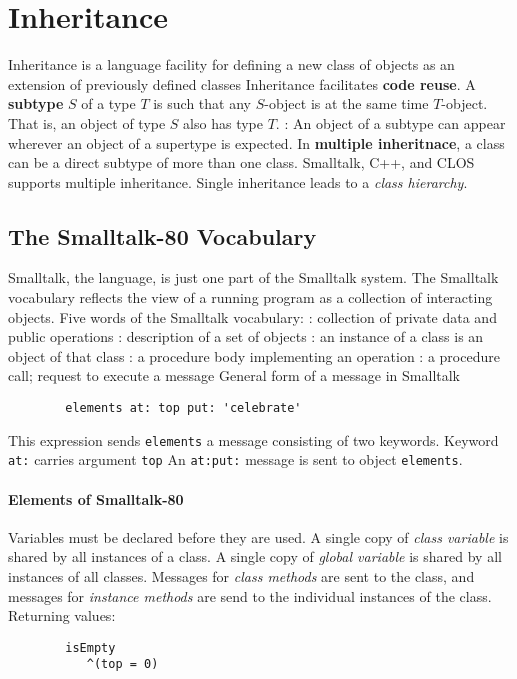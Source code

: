 \documentclass{article}
\begin{document}
\section{Inheritance}
\bit
\w Inheritance is a language facility for defining a new class of
	objects as an extension of previously defined classes
	\bit
	\w Inheritance facilitates {\bf{}code reuse}.
	\eit
\w A {\bf{}subtype} $S$ of a type $T$ is such that any $S$-object
	is at the same time $T$-object.
	\bit
	\w That is, an object of type $S$ also has type $T$.
	\eit
{}:
	\bit
	\w An object of a subtype can appear wherever an object of
		a supertype is expected.
	\eit
\w In {\bf{}multiple inheritnace}, a class can be a direct subtype of 
	more than one class.
	\bit
	\w Smalltalk, C++, and CLOS supports multiple inheritance.
	\eit
\w Single inheritance leads to a {\em{}class hierarchy\/}.
\eit

\subsection{The Smalltalk-80 Vocabulary}
\bit
\w Smalltalk, the language, is just one part of the Smalltalk 
	system.
\w The Smalltalk vocabulary reflects the view of a running program 
	as a collection of interacting objects.
\w Five words of the Smalltalk vocabulary:
	\bit
	: collection of private data and public operations
	: description of a set of objects
	: an instance of a class is an object of that class
	: a procedure body implementing an operation
	: a procedure call; request to execute a message
	\eit
\w General form of a message in Smalltalk
	\begin{verbatim}
        elements at: top put: 'celebrate'
	\end{verbatim}
	\bit
	\w This expression sends {\tt{}elements} a message consisting
		of two keywords.
	\w Keyword {\tt{}at:} carries argument {\tt{}top}
	\w An {\tt{}at:put:} message is sent to object {\tt{}elements}.
	\eit
\eit
\paragraph{Elements of Smalltalk-80}
\bit
\w Variables must be declared before they are used.
	\bit
	\w A single copy of {\em{}class variable\/} is shared by all instances
		of a class.
	\w A single copy of {\em{}global variable\/} is shared by all instances
		of all classes.
	\eit
\w Messages for {\em{}class methods\/}
	are sent to the class, and messages for {\em{}instance
	methods\/} are send to the individual instances of the class.
\w Returning values:
	\begin{verbatim}
        isEmpty
           ^(top = 0)
	\end{verbatim}
\eit
\end{document}
